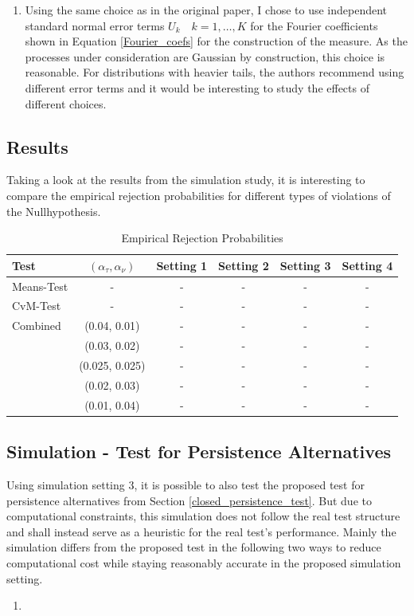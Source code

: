 \documentclass[12pt, a4paper]{article}
\theoremstyle{MAstyle} \newtheorem{assumption}{Assumption}[section]
\theoremstyle{MAstyle} \newtheorem{definition}{Definition}[section]
\theoremstyle{MAstyle} \newtheorem{theorem}{Theorem}[section]
\begin{document}
\begin{enumerate}
			\item Using the same choice as in the original paper, I chose to use independent standard normal error terms $U_k \quad k=1, \dots, K$ for the Fourier coefficients shown in Equation \ref{Fourier_coefs} for the construction of the measure. As the processes under consideration are Gaussian by construction, this choice is reasonable. For distributions with heavier tails, the authors recommend using different error terms and it would be interesting to study the effects of different choices.
		\end{enumerate}
		
		\subsection{Results}
		Taking a look at the results from the simulation study, it is interesting to compare the empirical rejection probabilities for different types of violations of the Nullhypothesis.
		
		\begin{table}[h!]
			\centering
			\begin{tabular}{lccccc}\toprule
				\textbf{Test}	&$\left(\alpha_{\tau}, \alpha_{\nu}\right) $ &\textbf{Setting 1} &\textbf{Setting 2}	&\textbf{Setting 3} &\textbf{Setting 4}\\
				\midrule
				Means-Test		& -	& -	& -  & - & - \\
				CvM-Test 		& -	& -	& -  & - & - \\
				\midrule
				Combined		& (0.04, 0.01)		& -	& -  & - & - \\
								& (0.03, 0.02)	& -	& -  & - & - \\
								& (0.025, 0.025)		& -	& -  & - & - \\
								& (0.02, 0.03)	& -	& -  & - & - \\
								& (0.01, 0.04)	& -	& -  & - & - \\
				\bottomrule
			\end{tabular}
			\caption{Empirical Rejection Probabilities}
		\end{table}
	
		\subsection{Simulation - Test for Persistence Alternatives}
		Using simulation setting 3, it is possible to also test the proposed test for persistence alternatives from Section \ref{closed_persistence_test}. But due to computational constraints, this simulation does not follow the real test structure and shall instead serve as a heuristic for the real test's performance. Mainly the simulation differs from the proposed test in the following two ways to reduce computational cost while staying reasonably accurate in the proposed simulation setting.
		\begin{enumerate}
			\item 
		\end{enumerate}
				
\end{document}
